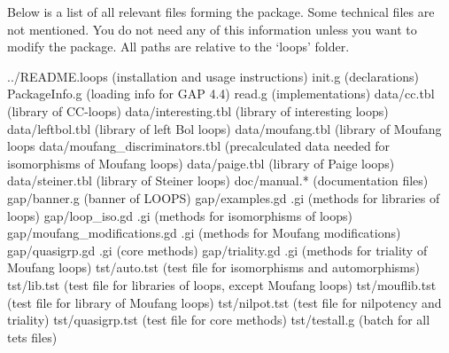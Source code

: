 
Below is a list of all relevant files forming the {\LOOPS} package. Some
technical files are not mentioned. You do not need any of this information
unless you want to modify the package. All paths are relative to the
`loops' folder.

\begintt
../README.loops (installation and usage instructions)
init.g (declarations)
PackageInfo.g (loading info for GAP 4.4)
read.g (implementations)
data/cc.tbl (library of CC-loops)
data/interesting.tbl (library of interesting loops)
data/leftbol.tbl (library of left Bol loops)
data/moufang.tbl (library of Moufang loops
data/moufang_discriminators.tbl (precalculated data needed for isomorphisms of Moufang loops)
data/paige.tbl (library of Paige loops)
data/steiner.tbl (library of Steiner loops)
doc/manual.* (documentation files)
gap/banner.g (banner of LOOPS)
gap/examples.gd .gi (methods for libraries of loops)
gap/loop_iso.gd .gi (methods for isomorphisms of loops)
gap/moufang_modifications.gd .gi (methods for Moufang modifications)
gap/quasigrp.gd .gi (core methods)
gap/triality.gd .gi (methods for triality of Moufang loops)
tst/auto.tst (test file for isomorphisms and automorphisms)
tst/lib.tst (test file for libraries of loops, except Moufang loops)
tst/mouflib.tst (test file for library of Moufang loops)
tst/nilpot.tst (test file for nilpotency and triality)
tst/quasigrp.tst (test file for core methods)
tst/testall.g (batch for all tets files)
\endtt
